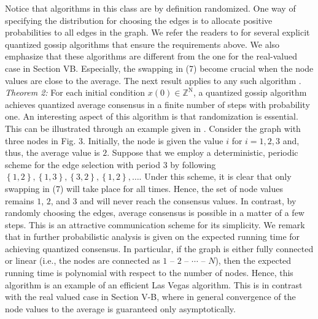 \documentclass[12pt]{article}
\begin{document}
			Notice that algorithms in this class are by definition randomized. One way of specifying the distribution for choosing the edges is to allocate positive probabilities to all edges in the graph. We refer the readers to \cite{bib13} for several explicit quantized gossip algorithms that ensure the requirements above. We also emphasize that these algorithms are different from the one for the real-valued case in Section VB. Especially, the swapping in (7) become crucial when the node values are close to the average.   The next result applies to any such algorithm \cite{bib13}. \textit{Theorem 2:} For each initial condition $x(0)\in \mathbb{Z}^{\mathrm{N}}$, a quantized gossip algorithm achieves quantized average consensus in a finite number of steps with probability one.  An interesting aspect of this algorithm is that randomization is essential. This can be illustrated through an example given in \cite{bib13}.  Consider the graph with three nodes in Fig. 3. Initially, the node is given the value $i$ for $i = 1, 2, 3$ and, thus, the average value is $2$.  Suppose that we employ a deterministic, periodic scheme for the edge selection with period 3 by following $\left\{ 1, 2 \right\}, \left\{ 1, 3 \right\}, \left\{ 3, 2 \right\}, \left\{ 1, 2 \right\}, \ldots$. Under this scheme, it is clear that only swapping in (7) will take place for all times. Hence, the set of node values remains $1$, $2$, and $3$ and will never reach the consensus values. In contrast, by randomly choosing the edges, average consensus is possible in a matter of a few steps. This is an attractive communication scheme for its simplicity.  We remark that in \cite{bib13} further probabilistic analysis is given on the expected running time for achieving quantized consensus. In particular, if the graph is either fully connected or linear (i.e., the nodes are connected as $1$ – $2$ – $\cdots$ – $N$), then the expected running time is polynomial with respect to the number of nodes. Hence, this algorithm is an example of an efficient Las Vegas algorithm. This is in contrast with the real valued case in Section V-B, where in general convergence of the node values to the average is guaranteed only asymptotically.  
			 
\end{document}
